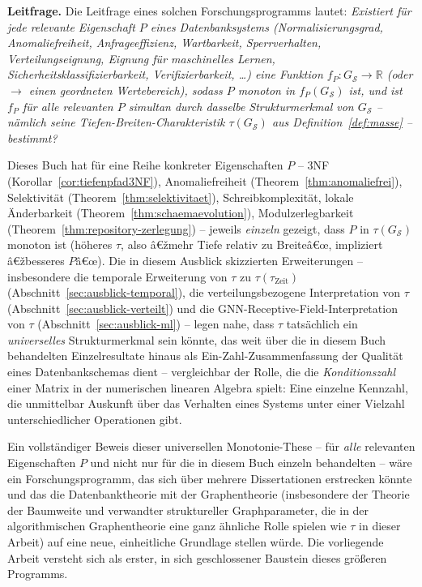 ﻿\documentclass[a4paper,12pt]{report}
\theoremstyle{definition}
\theoremstyle{remark}
\begin{document}
\textbf{Leitfrage.} Die Leitfrage eines solchen Forschungsprogramms
lautet: \emph{Existiert für jede relevante Eigenschaft $P$ eines
Datenbanksystems (Normalisierungsgrad, Anomaliefreiheit,
Anfrageeffizienz, Wartbarkeit, Sperrverhalten, Verteilungseignung,
Eignung für maschinelles Lernen, Sicherheitsklassifizierbarkeit,
Verifizierbarkeit, \ldots) eine Funktion $f_P: G_{\mathcal{S}} \to
\mathbb{R}$ (oder $\to$ einen geordneten Wertebereich), sodass $P$
\emph{monoton} in $f_P(G_{\mathcal{S}})$ ist, und ist $f_P$ für alle
relevanten $P$ \emph{simultan} durch dasselbe Strukturmerkmal von
$G_{\mathcal{S}}$ -- nämlich seine Tiefen-Breiten-Charakteristik
$\tau(G_{\mathcal{S}})$ aus Definition~\ref{def:masse} -- bestimmt?}

Dieses Buch hat für eine Reihe konkreter Eigenschaften $P$ -- 3NF
(Korollar~\ref{cor:tiefenpfad3NF}), Anomaliefreiheit
(Theorem~\ref{thm:anomaliefrei}), Selektivität
(Theorem~\ref{thm:selektivitaet}), Schreibkomplexität, lokale
Änderbarkeit (Theorem~\ref{thm:schaemaevolution}), Modulzerlegbarkeit
(Theorem~\ref{thm:repository-zerlegung}) -- jeweils \emph{einzeln}
gezeigt, dass $P$ in $\tau(G_{\mathcal{S}})$ monoton ist (höheres
$\tau$, also â€žmehr Tiefe relativ zu Breiteâ€œ, impliziert â€žbesseres
$P$â€œ). Die in diesem Ausblick skizzierten Erweiterungen --
insbesondere die temporale Erweiterung von $\tau$ zu
$\tau(\tau_{\text{Zeit}})$ (Abschnitt~\ref{sec:ausblick-temporal}),
die verteilungsbezogene Interpretation von $\tau$
(Abschnitt~\ref{sec:ausblick-verteilt}) und die
GNN-Receptive-Field-Interpretation von $\tau$
(Abschnitt~\ref{sec:ausblick-ml}) -- legen nahe, dass $\tau$ tatsächlich
ein \emph{universelles} Strukturmerkmal sein könnte, das weit über die
in diesem Buch behandelten Einzelresultate hinaus als
\glqq Ein-Zahl-Zusammenfassung\grqq{} der Qualität eines
Datenbankschemas dient -- vergleichbar der Rolle, die die
\emph{Konditionszahl} einer Matrix in der numerischen linearen
Algebra spielt: Eine einzelne Kennzahl, die unmittelbar Auskunft über
das Verhalten eines Systems unter einer Vielzahl unterschiedlicher
Operationen gibt.

Ein vollständiger Beweis dieser \glqq universellen Monotonie-These\grqq{}
-- für \emph{alle} relevanten Eigenschaften $P$ und nicht nur für die
in diesem Buch einzeln behandelten -- wäre ein Forschungsprogramm, das
sich über mehrere Dissertationen erstrecken könnte und das die
Datenbanktheorie mit der Graphentheorie (insbesondere der Theorie der
Baumweite und verwandter struktureller Graphparameter, die in der
algorithmischen Graphentheorie eine ganz ähnliche Rolle spielen wie
$\tau$ in dieser Arbeit) auf eine neue, einheitliche Grundlage stellen
würde. Die vorliegende Arbeit versteht sich als erster, in sich
geschlossener Baustein dieses größeren Programms.
\end{document}
